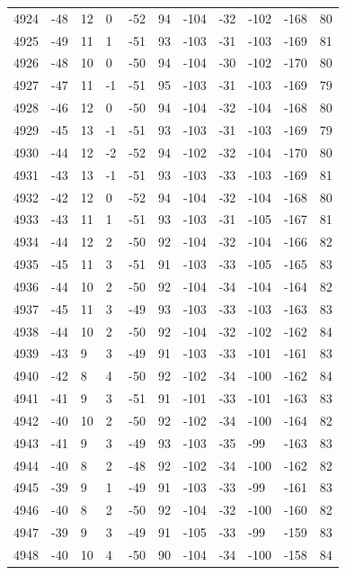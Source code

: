 \begin{table}[H]
\begin{tabular}{lllllllllll}
4924 & -48 & 12 & 0 & -52 & 94 & -104 & -32 & -102 & -168 & 80 \\
4925 & -49 & 11 & 1 & -51 & 93 & -103 & -31 & -103 & -169 & 81 \\
4926 & -48 & 10 & 0 & -50 & 94 & -104 & -30 & -102 & -170 & 80 \\
4927 & -47 & 11 & -1 & -51 & 95 & -103 & -31 & -103 & -169 & 79 \\
4928 & -46 & 12 & 0 & -50 & 94 & -104 & -32 & -104 & -168 & 80 \\
4929 & -45 & 13 & -1 & -51 & 93 & -103 & -31 & -103 & -169 & 79 \\
4930 & -44 & 12 & -2 & -52 & 94 & -102 & -32 & -104 & -170 & 80 \\
4931 & -43 & 13 & -1 & -51 & 93 & -103 & -33 & -103 & -169 & 81 \\
4932 & -42 & 12 & 0 & -52 & 94 & -104 & -32 & -104 & -168 & 80 \\
4933 & -43 & 11 & 1 & -51 & 93 & -103 & -31 & -105 & -167 & 81 \\
4934 & -44 & 12 & 2 & -50 & 92 & -104 & -32 & -104 & -166 & 82 \\
4935 & -45 & 11 & 3 & -51 & 91 & -103 & -33 & -105 & -165 & 83 \\
4936 & -44 & 10 & 2 & -50 & 92 & -104 & -34 & -104 & -164 & 82 \\
4937 & -45 & 11 & 3 & -49 & 93 & -103 & -33 & -103 & -163 & 83 \\
4938 & -44 & 10 & 2 & -50 & 92 & -104 & -32 & -102 & -162 & 84 \\
4939 & -43 & 9 & 3 & -49 & 91 & -103 & -33 & -101 & -161 & 83 \\
4940 & -42 & 8 & 4 & -50 & 92 & -102 & -34 & -100 & -162 & 84 \\
4941 & -41 & 9 & 3 & -51 & 91 & -101 & -33 & -101 & -163 & 83 \\
4942 & -40 & 10 & 2 & -50 & 92 & -102 & -34 & -100 & -164 & 82 \\
4943 & -41 & 9 & 3 & -49 & 93 & -103 & -35 & -99 & -163 & 83 \\
4944 & -40 & 8 & 2 & -48 & 92 & -102 & -34 & -100 & -162 & 82 \\
4945 & -39 & 9 & 1 & -49 & 91 & -103 & -33 & -99 & -161 & 83 \\
4946 & -40 & 8 & 2 & -50 & 92 & -104 & -32 & -100 & -160 & 82 \\
4947 & -39 & 9 & 3 & -49 & 91 & -105 & -33 & -99 & -159 & 83 \\
4948 & -40 & 10 & 4 & -50 & 90 & -104 & -34 & -100 & -158 & 84 \\

\end{tabular}
\end{table}
